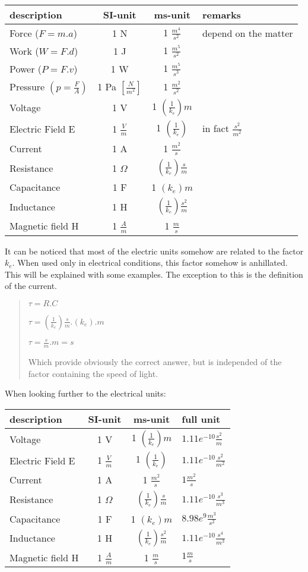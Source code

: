 \documentclass[]{article}
\begin{document}
\begin{longtable}[]{@{}lccl@{}}
\toprule
description & SI-unit & ms-unit & remarks\tabularnewline
\midrule
\endhead
Force (\(F=m.a\)) & 1 N & 1 \(\frac{m^4}{s^2}\) & depend on the
matter\tabularnewline
Work (\(W=F.d\)) & 1 J & 1 \(\frac{m^5}{s^2}\) &\tabularnewline
Power (\(P=F.v\)) & 1 W & 1 \(\frac{m^5}{s^3}\) &\tabularnewline
Pressure \((p=\frac{F}{A})\) & 1 Pa \([\frac{N}{m^2}]\) & 1
\(\frac{m^2}{s^2}\) &\tabularnewline
Voltage & 1 V & 1 \((\frac{1}{k_e})m\) &\tabularnewline
Electric Field E & 1 \(\frac{V}{m}\) & 1 \((\frac{1}{k_e})\) & in fact
\(\frac{s^2}{m^2}\)\tabularnewline
Current & 1 A & 1 \(\frac{m^2}{s}\) &\tabularnewline
Resistance & 1 \(\Omega\) & \((\frac{1}{k_e})\frac{s}{m}\)
&\tabularnewline
Capacitance & 1 F & 1 \((k_e)m\) &\tabularnewline
Inductance & 1 H & \((\frac{1}{k_e})\frac{s^2}{m}\) &\tabularnewline
Magnetic field H & 1 \(\frac{A}{m}\) & 1 \(\frac{m}{s}\)
&\tabularnewline
\bottomrule
\end{longtable}

It can be noticed that most of the electric units somehow are related to
the factor \(k_e\). When used only in electrical conditions, this factor
somehow is anhillated. This will be explained with some examples. The
exception to this is the definition of the current.

\begin{quote}
\(\tau= R.C\)

\(\tau = (\frac{1}{k_e})\frac{s}{m}.(k_e).m \)

\(\tau = \frac{s}{m}.m = s\)

Which provide obviously the correct answer, but is independed of the
factor containing the speed of light.
\end{quote}

When looking further to the electrical units:

\begin{longtable}[]{@{}lccl@{}}
\toprule
description & SI-unit & ms-unit & full unit\tabularnewline
\midrule
\endhead
Voltage & 1 V & 1 \((\frac{1}{k_e})m\) &
\(1.11e^{-10}\frac{s^2}{m}\)\tabularnewline
Electric Field E & 1 \(\frac{V}{m}\) & 1 \((\frac{1}{k_e})\) &
\(1.11e^{-10}\frac{s^2}{m^2}\)\tabularnewline
Current & 1 A & 1 \(\frac{m^2}{s}\) & \(1 \frac{m^2}{s}\)\tabularnewline
Resistance & 1 \(\Omega\) & \((\frac{1}{k_e})\frac{s}{m}\) &
\(1.11e^{-10}\frac{s^3}{m^3}\)\tabularnewline
Capacitance & 1 F & 1 \((k_e)m\) &
\(8.98e^{9}\frac{m^3}{s^2}\)\tabularnewline
Inductance & 1 H & \((\frac{1}{k_e})\frac{s^2}{m}\) &
\(1.11e^{-10}\frac{s^4}{m^3}\)\tabularnewline
Magnetic field H & 1 \(\frac{A}{m}\) & 1 \(\frac{m}{s}\) &
\(1 \frac{m}{s}\)\tabularnewline
\bottomrule
\end{longtable}
\end{document}
